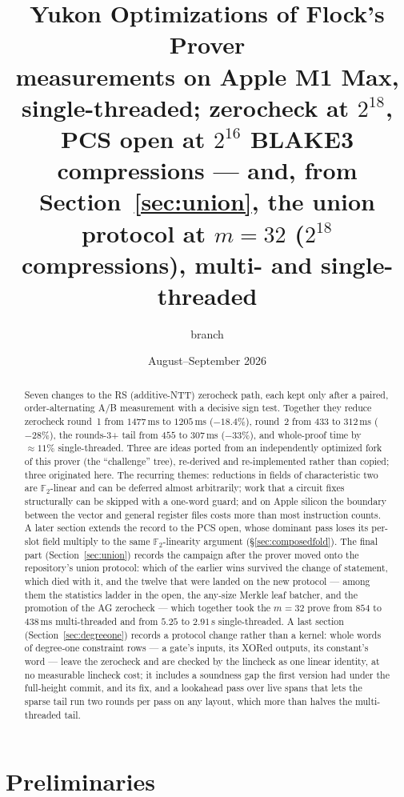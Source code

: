 \documentclass[11pt]{article}
\title{Yukon Optimizations of Flock's Prover\\
{\large measurements on Apple M1 Max, single-threaded; zerocheck at $2^{18}$,
PCS open at $2^{16}$ BLAKE3 compressions --- and, from
Section~\ref{sec:union}, the union protocol at $m{=}32$ ($2^{18}$
compressions), multi- and single-threaded}}
\author{branch \code{snark-fast-improvements}}
\date{August--September 2026}
\newcommand{\Ftwo}{\mathbb{F}_2}
\begin{document}
\maketitle

\begin{abstract}
Seven changes to the RS (additive-NTT) zerocheck path, each kept only after a
paired, order-alternating A/B measurement with a decisive sign test. Together
they reduce zerocheck round~1 from $1477\,$ms to $1205\,$ms ($-18.4\%$),
round~2 from $433$ to $312\,$ms ($-28\%$), the rounds-3+ tail from $455$ to
$307\,$ms ($-33\%$), and whole-proof time by $\approx11\%$
single-threaded. Three are ideas ported
from an independently optimized fork of this prover (the ``challenge'' tree),
re-derived and re-implemented rather than copied; three originated here. The
recurring themes: reductions in fields of characteristic two are
$\Ftwo$-linear and can be deferred almost arbitrarily; work that a circuit
fixes structurally can be skipped with a one-word guard; and on Apple silicon
the boundary between the vector and general register files costs more than
most instruction counts. A later section extends the record to the PCS open,
whose dominant pass loses its per-slot field multiply to the same
$\Ftwo$-linearity argument (\S\ref{sec:composedfold}). The final part
(Section~\ref{sec:union}) records the campaign after the prover moved
onto the repository's union protocol: which of the earlier wins
survived the change of statement, which died with it, and the twelve
that were landed on the new protocol --- among them the statistics
ladder in the open, the any-size Merkle leaf batcher, and the
promotion of the AG zerocheck --- which together took the $m{=}32$
prove from $854$ to $438$\,ms multi-threaded and from $5.25$ to
$2.91$\,s single-threaded. A last section (Section~\ref{sec:degreeone})
records a protocol change rather than a kernel: whole words of degree-one
constraint rows --- a gate's inputs, its XORed outputs, its constant's word
--- leave the zerocheck and are checked by the lincheck as one linear
identity, at no measurable lincheck cost; it includes a soundness gap the
first version had under the full-height commit, and its fix, and a
lookahead pass over live spans that lets the sparse tail run two rounds
per pass on any layout, which more than halves the multi-threaded tail.
\end{abstract}

\section*{Preliminaries}
\end{document}
